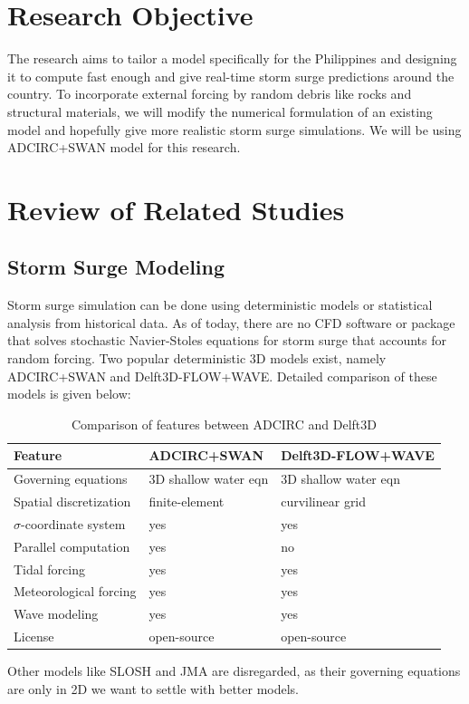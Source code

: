 \documentclass[a4paper, 10pt]{article}
\begin{document}
	\section{Research Objective}
	The research aims to tailor a model specifically for the Philippines and designing it to compute fast enough and give real-time storm surge predictions around the country.
	To incorporate external forcing by random debris like rocks and structural materials, we will modify the numerical formulation of an existing model and hopefully give more realistic storm surge simulations.
	We will be using ADCIRC+SWAN model \cite{bib:adcirc} for this research.
	
	\section{Review of Related Studies}
	\subsection{Storm Surge Modeling}
	Storm surge simulation can be done using deterministic models or statistical analysis from historical data. As of today, there are no CFD software or package that solves stochastic Navier-Stoles equations for storm surge that accounts for random forcing. Two popular deterministic 3D models exist, namely ADCIRC+SWAN and Delft3D-FLOW+WAVE. Detailed comparison of these models is given below:
	
	\begin{table}[H]
		\begin{tabular}{l|ll}
			\textbf{Feature} & \textbf{ADCIRC+SWAN} & \textbf{Delft3D-FLOW+WAVE} \\
			\hline
			Governing equations & 3D shallow water eqn & 3D shallow water eqn\\
			Spatial discretization & finite-element & curvilinear grid\\
			$\sigma$-coordinate system & yes & yes\\
			Parallel computation & yes & no\\
			Tidal forcing & yes & yes\\
			Meteorological forcing & yes & yes\\
			Wave modeling & yes & yes\\
			License & open-source & open-source\\
		\end{tabular}
		\caption{Comparison of features between ADCIRC and Delft3D}
	\end{table}
	Other models like SLOSH and JMA are disregarded, as their governing equations are only in 2D we want to settle with better models.
	
\end{document}
